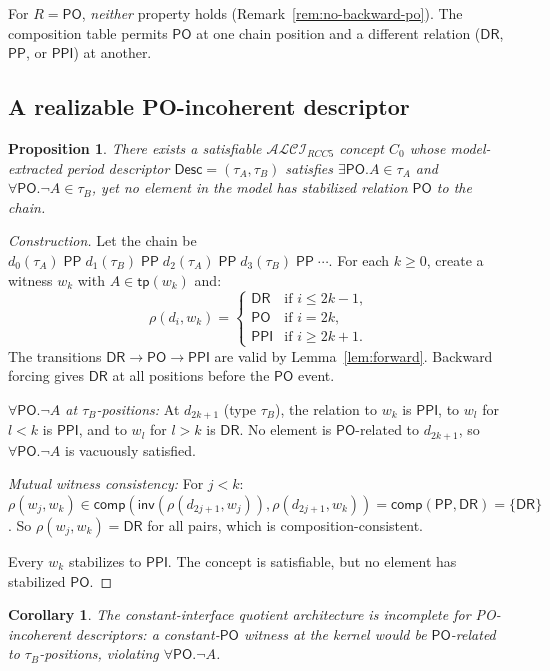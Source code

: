 \documentclass[a4paper,11pt]{article}
\newtheorem{proposition}[theorem]{Proposition}
\newtheorem{corollary}[theorem]{Corollary}
\theoremstyle{definition}
\newcommand{\ALCIRCC}[1]{\ensuremath{\mathcal{ALCI}_{\mathit{RCC#1}}}}
\newcommand{\DR}{\ensuremath{\mathsf{DR}}}
\newcommand{\PO}{\ensuremath{\mathsf{PO}}}
\newcommand{\PP}{\ensuremath{\mathsf{PP}}}
\newcommand{\PPI}{\ensuremath{\mathsf{PPI}}}
\newcommand{\inv}{\ensuremath{\mathsf{inv}}}
\newcommand{\comp}{\ensuremath{\mathsf{comp}}}
\newcommand{\tp}{\ensuremath{\mathsf{tp}}}
\newcommand{\Desc}{\ensuremath{\mathsf{Desc}}}
\begin{document}
For $R = \PO$, \emph{neither} property holds
(Remark~\ref{rem:no-backward-po}).  The composition table permits
$\PO$ at one chain position and a different relation ($\DR$, $\PP$,
or $\PPI$) at another.

\subsection{A realizable PO-incoherent descriptor}

\begin{proposition}\label{prop:po-incoherent}
There exists a satisfiable $\ALCIRCC{5}$ concept $C_0$ whose
model-extracted period descriptor $\Desc = (\tau_A, \tau_B)$
satisfies $\exists\PO.A \in \tau_A$ and
$\forall\PO.\neg A \in \tau_B$, yet no element in the model has
stabilized relation $\PO$ to the chain.
\end{proposition}

\begin{proof}[Construction]
Let the chain be $d_0(\tau_A)\;\PP\;d_1(\tau_B)\;\PP\;
d_2(\tau_A)\;\PP\;d_3(\tau_B)\;\PP\;\cdots$.  For each $k \ge 0$,
create a witness $w_k$ with $A \in \tp(w_k)$ and:
\[
\rho(d_i, w_k) = \begin{cases}
\DR & \text{if } i \le 2k - 1, \\
\PO & \text{if } i = 2k, \\
\PPI & \text{if } i \ge 2k + 1.
\end{cases}
\]
The transitions $\DR \to \PO \to \PPI$ are valid by
Lemma~\ref{lem:forward}.  Backward forcing gives $\DR$ at all
positions before the $\PO$ event.

\emph{$\forall\PO.\neg A$ at $\tau_B$-positions:}\; At
$d_{2k+1}$ (type $\tau_B$), the relation to $w_k$ is $\PPI$, to
$w_l$ for $l < k$ is $\PPI$, and to $w_l$ for $l > k$ is $\DR$.
No element is $\PO$-related to $d_{2k+1}$, so
$\forall\PO.\neg A$ is vacuously satisfied.

\emph{Mutual witness consistency:}\; For $j < k$:
$\rho(w_j, w_k) \in \comp(\inv(\rho(d_{2j+1}, w_j)),
\rho(d_{2j+1}, w_k)) = \comp(\PP, \DR) = \{\DR\}$.  So
$\rho(w_j, w_k) = \DR$ for all pairs, which is
composition-consistent.

Every $w_k$ stabilizes to $\PPI$.  The concept is satisfiable, but
no element has stabilized $\PO$.
\end{proof}

\begin{corollary}
The constant-interface quotient architecture is incomplete for
PO-incoherent descriptors: a constant-$\PO$ witness at the kernel
would be $\PO$-related to $\tau_B$-positions, violating
$\forall\PO.\neg A$.
\end{corollary}
\end{document}
